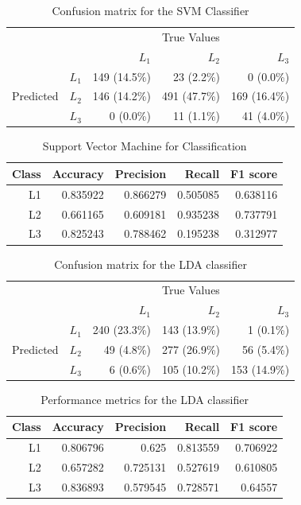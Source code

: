 \documentclass[conference]{IEEEtran}
\begin{document}
\begin{table}
\centering
  \caption{Confusion matrix for the SVM Classifier}
  \label{tab:conf_mat_svc}
  \begin{tabular}{rrrrr}
    \toprule
    & &\multicolumn{3}{c}{True Values}\\
    & & ${L_1}$ & ${L_2}$ & ${L_3}$ \\
    \multirow{3}{*}{Predicted} & ${L_1}$ & 149 (14.5\%) & 23 (2.2\%) & 0 (0.0\%) \\
    & ${L_2}$ & 146 (14.2\%) & 491 (47.7\%) & 169 (16.4\%) \\
    & ${L_3}$ & 0 (0.0\%) & 11 (1.1\%) & 41 (4.0\%) \\\bottomrule
  \end{tabular}
\end{table}
\begin{table}
\centering  \caption{Support Vector Machine for Classification}
\label{tab:perf_mat_svc}  \begin{tabular}{rrrrr}    \hline\hline    \textbf{Class} & \textbf{Accuracy} & \textbf{Precision} & \textbf{Recall} & \textbf{F1 score} \\\hline    L1 & 0.835922 & 0.866279 & 0.505085 & 0.638116 \\    L2 & 0.661165 & 0.609181 & 0.935238 & 0.737791 \\    L3 & 0.825243 & 0.788462 & 0.195238 & 0.312977 \\\hline\hline  \end{tabular}\end{table}

\begin{table}[h]
\centering
  \caption{Confusion matrix for the LDA classifier}
  \label{tab:conf_mat_lda}
  \begin{tabular}{rrrrr}
    \toprule
    & &\multicolumn{3}{c}{True Values}\\
    & & ${L_1}$ & ${L_2}$ & ${L_3}$ \\
    \multirow{3}{*}{Predicted} & ${L_1}$ & 240 (23.3\%) & 143 (13.9\%) & 1 (0.1\%) \\
    & ${L_2}$ & 49 (4.8\%) & 277 (26.9\%) & 56 (5.4\%) \\
    & ${L_3}$ & 6 (0.6\%) & 105 (10.2\%) & 153 (14.9\%) \\\bottomrule
  \end{tabular}
\end{table}
\begin{table}[h]
\centering
\label{tab:perf_met_lda}  \caption{Performance metrics for the LDA classifier}  \begin{tabular}{rrrrr}    \hline\hline    \textbf{Class} & \textbf{Accuracy} & \textbf{Precision} & \textbf{Recall} & \textbf{F1 score} \\\hline    L1 & 0.806796 & 0.625 & 0.813559 & 0.706922 \\    L2 & 0.657282 & 0.725131 & 0.527619 & 0.610805 \\    L3 & 0.836893 & 0.579545 & 0.728571 & 0.64557 \\\hline\hline  \end{tabular}\end{table}
\end{document}
